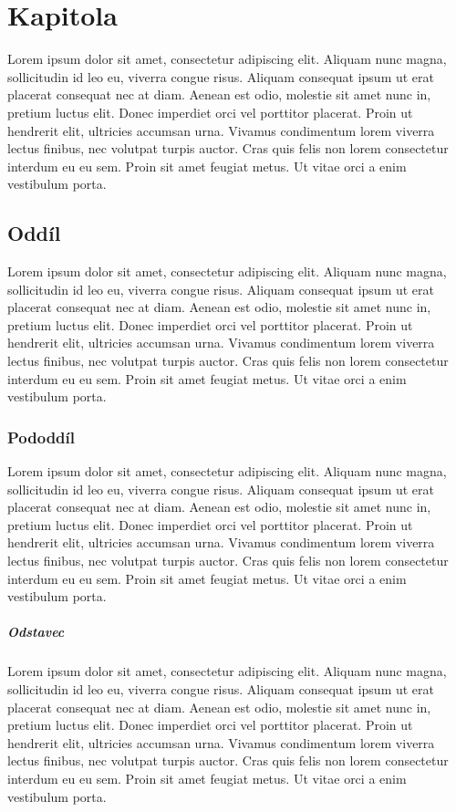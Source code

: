 \chapter{Kapitola}
Lorem ipsum dolor sit amet, consectetur adipiscing elit.
Aliquam nunc magna, sollicitudin id leo eu, viverra congue risus.
Aliquam consequat ipsum ut erat placerat consequat nec at diam. 
Aenean est odio, molestie sit amet nunc in, pretium luctus elit. 
Donec imperdiet orci vel porttitor placerat. 
Proin ut hendrerit elit, ultricies accumsan urna. 
Vivamus condimentum lorem viverra lectus finibus, nec volutpat turpis auctor.
Cras quis felis non lorem consectetur interdum eu eu sem. 
Proin sit amet feugiat metus. 
Ut vitae orci a enim vestibulum porta. 

\section{Oddíl}
Lorem ipsum dolor sit amet, consectetur adipiscing elit.
Aliquam nunc magna, sollicitudin id leo eu, viverra congue risus.
Aliquam consequat ipsum ut erat placerat consequat nec at diam. 
Aenean est odio, molestie sit amet nunc in, pretium luctus elit. 
Donec imperdiet orci vel porttitor placerat. 
Proin ut hendrerit elit, ultricies accumsan urna. 
Vivamus condimentum lorem viverra lectus finibus, nec volutpat turpis auctor.
Cras quis felis non lorem consectetur interdum eu eu sem. 
Proin sit amet feugiat metus. 
Ut vitae orci a enim vestibulum porta. 

\subsection{Pododdíl}
Lorem ipsum dolor sit amet, consectetur adipiscing elit.
Aliquam nunc magna, sollicitudin id leo eu, viverra congue risus.
Aliquam consequat ipsum ut erat placerat consequat nec at diam. 
Aenean est odio, molestie sit amet nunc in, pretium luctus elit. 
Donec imperdiet orci vel porttitor placerat. 
Proin ut hendrerit elit, ultricies accumsan urna. 
Vivamus condimentum lorem viverra lectus finibus, nec volutpat turpis auctor.
Cras quis felis non lorem consectetur interdum eu eu sem. 
Proin sit amet feugiat metus. 
Ut vitae orci a enim vestibulum porta. 

\paragraph{Odstavec}
Lorem ipsum dolor sit amet, consectetur adipiscing elit.
Aliquam nunc magna, sollicitudin id leo eu, viverra congue risus.
Aliquam consequat ipsum ut erat placerat consequat nec at diam. 
Aenean est odio, molestie sit amet nunc in, pretium luctus elit. 
Donec imperdiet orci vel porttitor placerat. 
Proin ut hendrerit elit, ultricies accumsan urna. 
Vivamus condimentum lorem viverra lectus finibus, nec volutpat turpis auctor.
Cras quis felis non lorem consectetur interdum eu eu sem. 
Proin sit amet feugiat metus. 
Ut vitae orci a enim vestibulum porta. 

